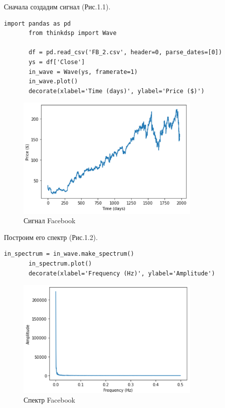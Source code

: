 \documentclass[a4paper,12pt]{report}
\begin{document}
    Сначала создадим сигнал (Рис.1.1).
\begin{lstlisting}[caption=Создание сигнала Facebook]
       import pandas as pd
       from thinkdsp import Wave

       df = pd.read_csv('FB_2.csv', header=0, parse_dates=[0])
       ys = df['Close']
       in_wave = Wave(ys, framerate=1)
       in_wave.plot()
       decorate(xlabel='Time (days)', ylabel='Price ($)')
\end{lstlisting}
\begin{figure}[H]
        \centering
        \includegraphics[width=0.8\textwidth]{fig1-1.PNG}
        \caption{Сигнал Facebook}
        \label{fig:fig1-1}
\end{figure} 

    Построим его спектр (Рис.1.2).    
\begin{lstlisting}[caption=Построение спектра Facebook]
       in_spectrum = in_wave.make_spectrum()
       in_spectrum.plot()
       decorate(xlabel='Frequency (Hz)', ylabel='Amplitude')
\end{lstlisting}
\begin{figure}[H]
        \centering
        \includegraphics[width=0.8\textwidth]{fig1-2.PNG}
        \caption{Спектр Facebook}
        \label{fig:fig1-2}
\end{figure} 
\end{document}
